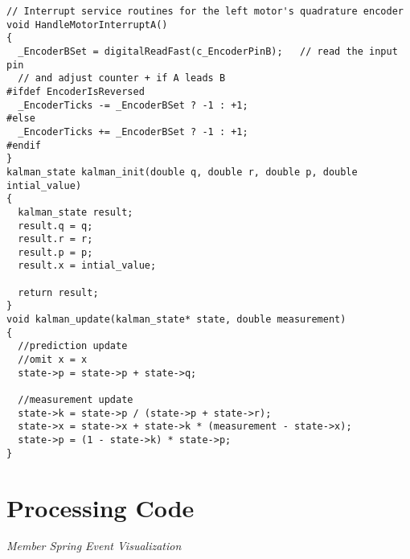 \begin{lstlisting}[style=codearduino]
// Interrupt service routines for the left motor's quadrature encoder
void HandleMotorInterruptA()
{
  _EncoderBSet = digitalReadFast(c_EncoderPinB);   // read the input pin
  // and adjust counter + if A leads B
#ifdef EncoderIsReversed
  _EncoderTicks -= _EncoderBSet ? -1 : +1;
#else
  _EncoderTicks += _EncoderBSet ? -1 : +1;
#endif
}
kalman_state kalman_init(double q, double r, double p, double intial_value)
{
  kalman_state result;
  result.q = q;
  result.r = r;
  result.p = p;
  result.x = intial_value;

  return result;
}
void kalman_update(kalman_state* state, double measurement)
{
  //prediction update
  //omit x = x
  state->p = state->p + state->q;

  //measurement update
  state->k = state->p / (state->p + state->r);
  state->x = state->x + state->k * (measurement - state->x);
  state->p = (1 - state->k) * state->p;
}
\end{lstlisting}

\chapter{Processing Code}
\textit{Member Spring Event Visualization} \\[10pt]

\newpage
